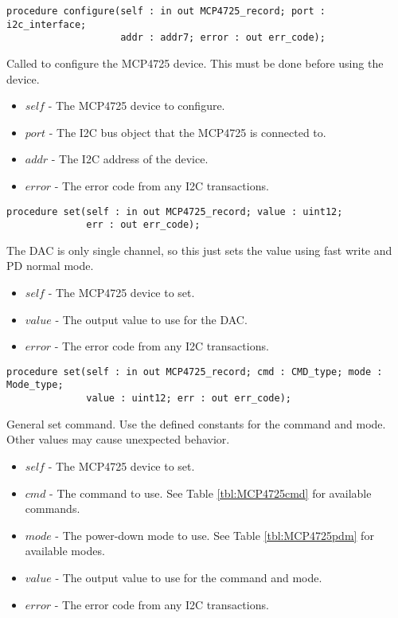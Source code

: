 \documentclass[10pt, openany]{book}
\newcommand{\indexfunc}[1]{\index[func]{#1}}
\begin{document}
\begin{lstlisting}
procedure configure(self : in out MCP4725_record; port : i2c_interface;
                    addr : addr7; error : out err_code);
\end{lstlisting}
\indexfunc{configure}
Called to configure the MCP4725 device.  This must be done before using the device.
\begin{itemize}
  \item $self$ - The MCP4725 device to configure.
  \item $port$ - The I2C bus object that the MCP4725 is connected to.
  \item $addr$ - The I2C address of the device.
  \item $error$ - The error code from any I2C transactions.
\end{itemize}

\begin{lstlisting}
procedure set(self : in out MCP4725_record; value : uint12;
              err : out err_code);
\end{lstlisting}
\indexfunc{set}
The DAC is only single channel, so this just sets the value using fast write and PD normal mode.
\begin{itemize}
  \item $self$ - The MCP4725 device to set.
  \item $value$ - The output value to use for the DAC.
  \item $error$ - The error code from any I2C transactions.
\end{itemize}

\begin{lstlisting}
procedure set(self : in out MCP4725_record; cmd : CMD_type; mode : Mode_type;
              value : uint12; err : out err_code);
\end{lstlisting}
\indexfunc{set}
General set command.  Use the defined constants for the command and mode.  Other values may cause unexpected behavior.
\begin{itemize}
  \item $self$ - The MCP4725 device to set.
  \item $cmd$ - The command to use.  See Table \ref{tbl:MCP4725cmd} for available commands.
  \item $mode$ - The power-down mode to use.  See Table \ref{tbl:MCP4725pdm} for available modes.
  \item $value$ - The output value to use for the command and mode.
  \item $error$ - The error code from any I2C transactions.
\end{itemize}
\end{document}
